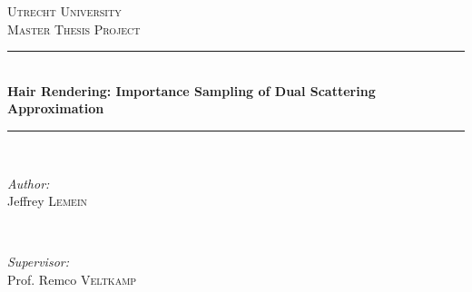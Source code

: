 \documentclass[11pt,a4paper]{report}
\begin{document}
\begin{titlepage}

\newcommand{\HRule}{\rule{\linewidth}{0.5mm}} %

\center %
 

\textsc{\LARGE Utrecht University}\\[1.5cm] %
\textsc{\Large Master Thesis Project}\\[0.5cm] %


\HRule \\[0.4cm]
{ \huge \bfseries Hair Rendering: Importance Sampling of Dual Scattering Approximation}\\[0.4cm] %
\HRule \\[1.5cm]
 

\begin{minipage}{0.4\textwidth}
\begin{flushleft} \large
\emph{Author:}\\
Jeffrey \textsc{Lemein}%
\end{flushleft}
\end{minipage}
~
\begin{minipage}{0.4\textwidth}
\begin{flushright} \large
\emph{Supervisor:} \\
Prof. Remco \textsc{Veltkamp} \\ %
\end{flushright}
\end{minipage}\\[4cm]


\end{titlepage}
\end{document}
